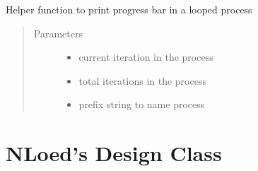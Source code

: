 \documentclass[letterpaper,10pt,english,openany,oneside]{sphinxmanual}
\begin{document}
\begin{fulllineitems}

\begin{fulllineitems}
\label{\detokenize{nloed:nloed.model.Model._progress_bar}}
Helper function to print progress bar in a looped process
\begin{quote}\begin{description}
\item[{Parameters}] \leavevmode\begin{itemize}
\item {} 
 \textendash{} current iteration in the process

\item {} 
 \textendash{} total iterations in the process

\item {} 
 \textendash{} prefix string to name process

\end{itemize}

\end{description}\end{quote}

\end{fulllineitems}


\end{fulllineitems}



\chapter{NLoed’s Design Class}
\label{\detokenize{nloed:module-nloed.design}}\label{\detokenize{nloed:nloed-s-design-class}}
\end{document}
